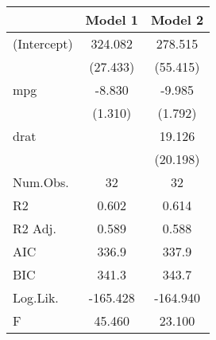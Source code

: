 \begin{table}
\centering
\begin{tabular}[t]{lcc}
\toprule
  & Model 1 & Model 2\\
\midrule
(Intercept) & 324.082 & 278.515\\
 & (27.433) & (55.415)\\
mpg & -8.830 & -9.985\\
 & (1.310) & (1.792)\\
drat &  & 19.126\\
 &  & (20.198)\\
\midrule
Num.Obs. & 32 & 32\\
R2 & 0.602 & 0.614\\
R2 Adj. & 0.589 & 0.588\\
AIC & 336.9 & 337.9\\
BIC & 341.3 & 343.7\\
Log.Lik. & -165.428 & -164.940\\
F & 45.460 & 23.100\\
\bottomrule
\end{tabular}
\end{table}
